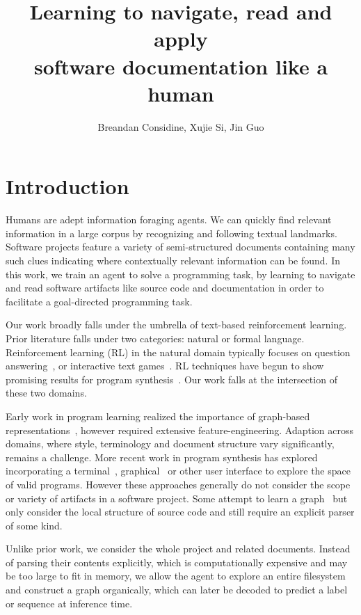 \documentclass[11pt]{article}
\title{Learning to navigate, read and apply\\software documentation like a human}
\author{Breandan Considine, Xujie Si, Jin Guo}
\begin{document}
\maketitle

\section{Introduction}

Humans are adept information foraging agents. We can quickly find relevant information in a large corpus by recognizing and following textual landmarks. Software projects feature a variety of semi-structured documents containing many such clues indicating where contextually relevant information can be found. In this work, we train an agent to solve a programming task, by learning to navigate and read software artifacts like source code and documentation in order to facilitate a goal-directed programming task.

Our work broadly falls under the umbrella of text-based reinforcement learning. Prior literature falls under two categories: natural or formal language. Reinforcement learning (RL) in the natural domain typically focuses on question answering~\cite{buck2017ask, chen2019reinforcement}, or interactive text games~\cite{he2015deep,ammanabrolu2018playing,narasimhan2015language,guo2020interactive,ammanabrolu2020graph}. RL techniques have begun to show promising results for program synthesis~\cite{ellis2019write, johnson2020learning, chen2020program}. Our work falls at the intersection of these two domains.

Early work in program learning realized the importance of graph-based representations~\cite{allamanis2017learning}, however required extensive feature-engineering. Adaption across domains, where style, terminology and document structure vary significantly, remains a challenge. More recent work in program synthesis has explored incorporating a terminal~\cite{ellis2019write}, graphical~\cite{walke2020learning} or other user interface to explore the space of valid programs. However these approaches generally do not consider the scope or variety of artifacts in a software project. Some attempt to learn a graph~\cite{johnson2020learning} but only consider the local structure of source code and still require an explicit parser of some kind.

Unlike prior work, we consider the whole project and related documents. Instead of parsing their contents explicitly, which is computationally expensive and may be too large to fit in memory, we allow the agent to explore an entire filesystem and construct a graph organically, which can later be decoded to predict a label or sequence at inference time.
\end{document}
